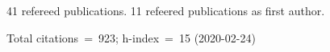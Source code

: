 41 refereed publications. 11 refeered publications as first author.

Total citations~=~923; h-index~=~15 (2020-02-24)